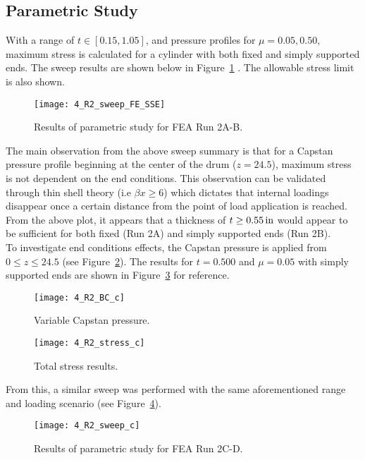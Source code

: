 \subsection{Parametric Study}

With a range of $t\in [0.15, 1.05]$, and pressure profiles for $\mu =0.05, 0.50$, maximum stress is calculated for a cylinder with both fixed and simply supported ends. The sweep results are shown below in Figure~\ref{fig:4_R2_sweep} \cite{EXCEL}.  The allowable stress limit is also shown.

\begin{figure}[H]
	\centering
	\texttt{[image: 4\_R2\_sweep\_FE\_SSE]}
	\caption{Results of parametric study for FEA Run 2A-B.}
	\label{fig:4_R2_sweep}
\end{figure}

The main observation from the above sweep summary is that for a Capstan pressure profile beginning at the center of the drum ($z=24.5$), maximum stress is not dependent on the end conditions. This observation can be validated through thin shell theory (i.e $\beta x \geq 6$) which dictates that internal loadings disappear once a certain distance from the point of load application is reached.\\

From the above plot, it appears that a thickness of $t \geq 0.55 \,\mathrm{in}$ would appear to be sufficient for both fixed (Run 2A) and simply supported ends (Run 2B).\\

To investigate end conditions effects, the Capstan pressure is applied from $0 \leq z \leq 24.5$ (see Figure~\ref{fig:4_R2_BC_c}). The results for $t=0.500$ and $\mu=0.05$ with simply supported ends are shown in Figure~\ref{fig:4_R2_stress_c} for reference.
\begin{figure}[H]
	\centering
	\texttt{[image: 4\_R2\_BC\_c]}
	\caption{Variable Capstan pressure.}
	\label{fig:4_R2_BC_c}
\end{figure}

\begin{figure}[H]
	\centering
	\texttt{[image: 4\_R2\_stress\_c]}
	\caption{Total stress results.}
	\label{fig:4_R2_stress_c}
\end{figure}

From this, a similar sweep was performed with the same aforementioned range and loading scenario (see Figure~\ref{fig:4_R2_sweep2}).

\begin{figure}[H]
	\centering
	\texttt{[image: 4\_R2\_sweep\_c]}
	\caption{Results of parametric study for FEA Run 2C-D.}
	\label{fig:4_R2_sweep2}
\end{figure}

